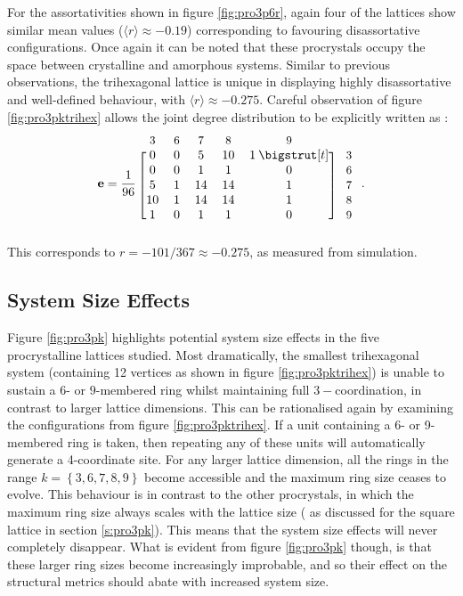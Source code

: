 For the assortativities shown in figure \ref{fig:pro3p6r}, again four of the lattices show similar mean values ($\langle r \rangle\approx -0.19$) corresponding to favouring disassortative configurations. 
Once again it can be noted that these procrystals occupy the space between crystalline and amorphous systems.
Similar to previous observations, the trihexagonal lattice is unique in displaying highly disassortative and well\--defined behaviour, with $\langle r \rangle \approx -0.275$.
Careful observation of figure \ref{fig:pro3pktrihex} allows the joint degree distribution to be explicitly written as :
\begin{equation}
	\mathbf{e} = \frac{1}{96}\: \begin{blockarray}{*{5}{c} l}
	\begin{block}{*{5}{>{$\footnotesize}c<{$}} l}
	3 & 6 & 7 & 8 & 9 \\
	\end{block}
	\begin{block}{[*{5}{c}]>{$\footnotesize}l<{$}}
	0 & 0 & 5 & 10 & 1\: \bigstrut[t]& \:3\\
	0 & 0 & 1 & 1 & 0 & \:6 \\
	5 & 1 & 14 & 14 & 1 & \:7\\
	10 & 1 & 14 & 14 & 1 & \:8\\
	1 & 0 & 1 & 1 & 0 & \:9\\
	\end{block}
	\end{blockarray}\,.
\end{equation} 
This corresponds to $r=-101/367\approx -0.275$, as measured from simulation.

\subsection{System Size Effects}

Figure \ref{fig:pro3pk} highlights potential system size effects in the five procrystalline lattices studied.
Most dramatically, the smallest trihexagonal system (containing 12 vertices as shown in figure \ref{fig:pro3pktrihex}) is unable to sustain a $6$\-- or $9$\--membered ring whilst maintaining full $3-$coordination, in contrast to larger lattice dimensions.
This can be rationalised again by examining the configurations from figure \ref{fig:pro3pktrihex}.
If a unit containing a 6\-- or 9\--membered ring is taken, then repeating any of these units will automatically generate a 4\--coordinate site. 
For any larger lattice dimension, all the rings in the range $k=\left\{3,6,7,8,9\right\}$ become accessible and the maximum ring size ceases to evolve.
This behaviour is in contrast to the other procrystals, in which the maximum ring size always scales with the lattice size (\eg{} as discussed for the square lattice in section \ref{s:pro3pk}).
This means that the system size effects will never completely disappear.
What is evident from figure \ref{fig:pro3pk} though, is that these larger ring sizes become increasingly improbable, and so their effect on the structural metrics should abate with increased system size.

